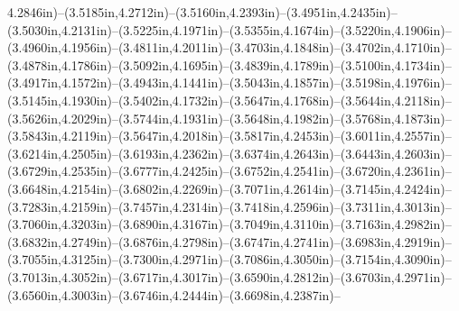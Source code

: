 4.2846in)--(3.5185in,4.2712in)--(3.5160in,4.2393in)--(3.4951in,4.2435in)--(3.5030in,4.2131in)--(3.5225in,4.1971in)--(3.5355in,4.1674in)--(3.5220in,4.1906in)--(3.4960in,4.1956in)--(3.4811in,4.2011in)--(3.4703in,4.1848in)--(3.4702in,4.1710in)--(3.4878in,4.1786in)--(3.5092in,4.1695in)--(3.4839in,4.1789in)--(3.5100in,4.1734in)--(3.4917in,4.1572in)--(3.4943in,4.1441in)--(3.5043in,4.1857in)--(3.5198in,4.1976in)--(3.5145in,4.1930in)--(3.5402in,4.1732in)--(3.5647in,4.1768in)--(3.5644in,4.2118in)--(3.5626in,4.2029in)--(3.5744in,4.1931in)--(3.5648in,4.1982in)--(3.5768in,4.1873in)--(3.5843in,4.2119in)--(3.5647in,4.2018in)--(3.5817in,4.2453in)--(3.6011in,4.2557in)--(3.6214in,4.2505in)--(3.6193in,4.2362in)--(3.6374in,4.2643in)--(3.6443in,4.2603in)--(3.6729in,4.2535in)--(3.6777in,4.2425in)--(3.6752in,4.2541in)--(3.6720in,4.2361in)--(3.6648in,4.2154in)--(3.6802in,4.2269in)--(3.7071in,4.2614in)--(3.7145in,4.2424in)--(3.7283in,4.2159in)--(3.7457in,4.2314in)--(3.7418in,4.2596in)--(3.7311in,4.3013in)--(3.7060in,4.3203in)--(3.6890in,4.3167in)--(3.7049in,4.3110in)--(3.7163in,4.2982in)--(3.6832in,4.2749in)--(3.6876in,4.2798in)--(3.6747in,4.2741in)--(3.6983in,4.2919in)--(3.7055in,4.3125in)--(3.7300in,4.2971in)--(3.7086in,4.3050in)--(3.7154in,4.3090in)--(3.7013in,4.3052in)--(3.6717in,4.3017in)--(3.6590in,4.2812in)--(3.6703in,4.2971in)--(3.6560in,4.3003in)--(3.6746in,4.2444in)--(3.6698in,4.2387in)--
